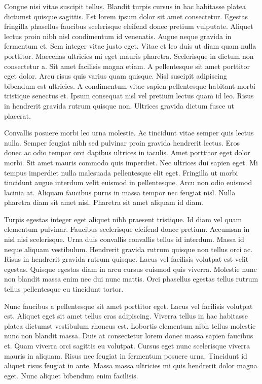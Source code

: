 \documentclass[11pt,a4paper]{article}
\begin{document}
Congue nisi vitae suscipit tellus. Blandit turpis cursus in hac habitasse platea dictumst quisque sagittis. Est lorem ipsum dolor sit amet consectetur. Egestas fringilla phasellus faucibus scelerisque eleifend donec pretium vulputate. Aliquet lectus proin nibh nisl condimentum id venenatis. Augue neque gravida in fermentum et. Sem integer vitae justo eget. Vitae et leo duis ut diam quam nulla porttitor. Maecenas ultricies mi eget mauris pharetra. Scelerisque in dictum non consectetur a. Sit amet facilisis magna etiam. A pellentesque sit amet porttitor eget dolor. Arcu risus quis varius quam quisque. Nisl suscipit adipiscing bibendum est ultricies. A condimentum vitae sapien pellentesque habitant morbi tristique senectus et. Ipsum consequat nisl vel pretium lectus quam id leo. Risus in hendrerit gravida rutrum quisque non. Ultrices gravida dictum fusce ut placerat.

Convallis posuere morbi leo urna molestie. Ac tincidunt vitae semper quis lectus nulla. Semper feugiat nibh sed pulvinar proin gravida hendrerit lectus. Eros donec ac odio tempor orci dapibus ultrices in iaculis. Amet porttitor eget dolor morbi. Sit amet mauris commodo quis imperdiet. Nec ultrices dui sapien eget. Mi tempus imperdiet nulla malesuada pellentesque elit eget. Fringilla ut morbi tincidunt augue interdum velit euismod in pellentesque. Arcu non odio euismod lacinia at. Aliquam faucibus purus in massa tempor nec feugiat nisl. Nulla pharetra diam sit amet nisl. Pharetra sit amet aliquam id diam.

Turpis egestas integer eget aliquet nibh praesent tristique. Id diam vel quam elementum pulvinar. Faucibus scelerisque eleifend donec pretium. Accumsan in nisl nisi scelerisque. Urna duis convallis convallis tellus id interdum. Massa id neque aliquam vestibulum. Hendrerit gravida rutrum quisque non tellus orci ac. Risus in hendrerit gravida rutrum quisque. Lacus vel facilisis volutpat est velit egestas. Quisque egestas diam in arcu cursus euismod quis viverra. Molestie nunc non blandit massa enim nec dui nunc mattis. Orci phasellus egestas tellus rutrum tellus pellentesque eu tincidunt tortor.

Nunc faucibus a pellentesque sit amet porttitor eget. Lacus vel facilisis volutpat est. Aliquet eget sit amet tellus cras adipiscing. Viverra tellus in hac habitasse platea dictumst vestibulum rhoncus est. Lobortis elementum nibh tellus molestie nunc non blandit massa. Duis at consectetur lorem donec massa sapien faucibus et. Quam viverra orci sagittis eu volutpat. Cursus eget nunc scelerisque viverra mauris in aliquam. Risus nec feugiat in fermentum posuere urna. Tincidunt id aliquet risus feugiat in ante. Massa massa ultricies mi quis hendrerit dolor magna eget. Nunc aliquet bibendum enim facilisis.
\end{document}

